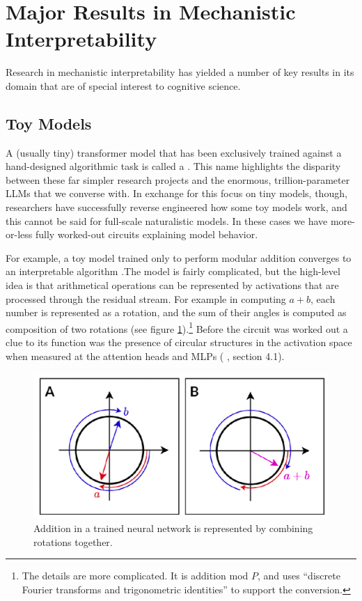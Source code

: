 
\section{Major Results in Mechanistic Interpretability}

Research in mechanistic interpretability has yielded a number of key results in
its domain that are of special interest to cognitive science.

\subsection{Toy Models}

A (usually tiny) transformer model that has been exclusively trained against a
hand-designed algorithmic task is called a . This name
highlights the disparity between these far simpler research projects and the
enormous, trillion-parameter LLMs that we converse with. In exchange for this
focus on tiny models, though, researchers have successfully reverse engineered
how some toy models work, and this cannot be said for full-scale naturalistic
models. In these cases we have more-or-less fully worked-out circuits
explaining model behavior.

For example, a toy model trained only to perform modular addition converges to
an interpretable algorithm \cite{nanda2023progress}.The model is fairly
complicated, but the high-level idea is that arithmetical operations can be
represented by activations that are processed through the residual stream. For
example in computing $a + b$, each number is represented as a rotation, and the
sum of their angles is computed as composition of two rotations (see figure
\ref{toyModelAddition}).\footnote{The details are more complicated. It is
addition mod $P$, and uses ``discrete Fourier transforms and trigonometric
identities'' \cite{nanda2023progress} to support the conversion.} Before the
circuit was worked out a clue to its function was the presence of circular
structures in the activation space when measured at the attention heads and
MLPs (\cite{nanda2023progress} , section 4.1).

\begin{figure}[ht]
\centering
\includegraphics[scale=.4]{./images/toyModelAddition.png}
\caption[From \cite{nanda2023progress} .]{
      Addition in a trained neural network is represented by combining
      rotations together.
}
\label{toyModelAddition}
\end{figure}

